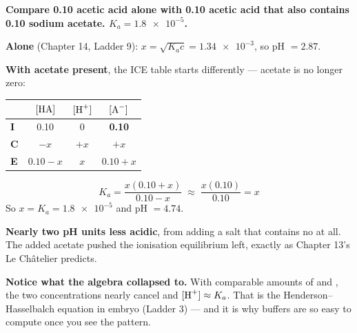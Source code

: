 \documentclass{apchem-worksheet}
\begin{document}
\begin{workedexample}
\textbf{Compare \SI{0.10}{\Molar} acetic acid alone with
\SI{0.10}{\Molar} acetic acid that also contains \SI{0.10}{\Molar}
sodium acetate. $K_{a} = \num{1.8e-5}$.}

\textbf{Alone} (Chapter 14, Ladder 9): $x = \sqrt{K_{a}c} =
\num{1.34e-3}$, so pH $= 2.87$.

\textbf{With acetate present}, the ICE table starts differently ---
acetate is no longer zero:
\begin{center}
\renewcommand{\arraystretch}{1.15}
\begin{tabular}{@{}lccc@{}}
\toprule
& $[\ce{HA}]$ & $[\ce{H+}]$ & $[\ce{A-}]$ \\
\midrule
\textbf{I} & 0.10 & 0 & \textbf{0.10} \\
\textbf{C} & $-x$ & $+x$ & $+x$ \\
\textbf{E} & $0.10-x$ & $x$ & $0.10+x$ \\
\bottomrule
\end{tabular}
\end{center}

\[ K_{a} = \frac{x(0.10+x)}{0.10-x}
   \;\approx\; \frac{x(0.10)}{0.10} = x \]
So $x = K_{a} = \num{1.8e-5}$ and pH $= 4.74$.

\textbf{Nearly two pH units less acidic}, from adding a salt that
contains no  at all. The added acetate pushed the ionisation
equilibrium left, exactly as Chapter 13's Le Ch\^{a}telier predicts.

\textbf{Notice what the algebra collapsed to.} With comparable amounts
of  and , the two concentrations nearly cancel and
$[\ce{H+}] \approx K_{a}$. That is the Henderson--Hasselbalch equation
in embryo (Ladder 3) --- and it is why buffers are so easy to compute
once you see the pattern.
\end{workedexample}
\end{document}
